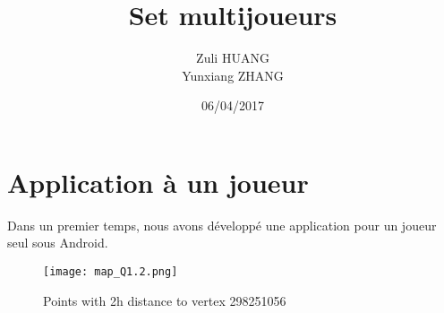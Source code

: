 \documentclass[titlepage,11pt,a4paper]{article}
\title[INF 431 Programming Project]{Set multijoueurs}
\author{Zuli \textsc{HUANG}\\
            Yunxiang \textsc{ZHANG}
            }
\date{06/04/2017}
\begin{document}
\maketitle

\section{Application à un joueur}
Dans un premier temps, nous avons développé une application pour un joueur seul sous Android.

\begin{figure}[h]
    \centering
    \texttt{[image: map\_Q1.2.png]}
    \caption{Points with 2h distance to vertex 298251056}
    \label{fig:questioin_1.2_out}
\end{figure}
\end{document}
